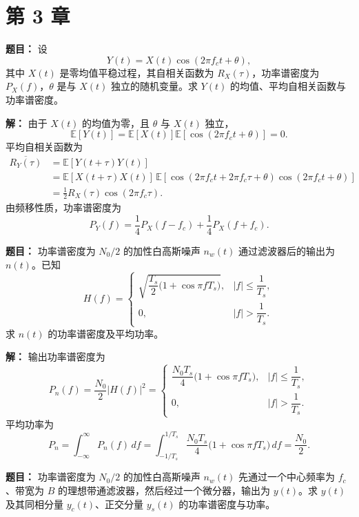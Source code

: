 \section*{第 3 章}

\textbf{题目：}
设
\[
Y(t)=X(t)\cos(2\pi f_c t+\theta),
\]
其中 $X(t)$ 是零均值平稳过程，其自相关函数为 $R_X(\tau)$，功率谱密度为 $P_X(f)$，$\theta$ 是与 $X(t)$ 独立的随机变量。求 $Y(t)$ 的均值、平均自相关函数与功率谱密度。

\par\textbf{解：}
由于 $X(t)$ 的均值为零，且 $\theta$ 与 $X(t)$ 独立，
\[
\mathbb{E}[Y(t)]=\mathbb{E}[X(t)]\mathbb{E}[\cos(2\pi f_c t+\theta)]=0.
\]
平均自相关函数为
\begin{align*}
\overline{R_Y(\tau)}
&=\mathbb{E}[Y(t+\tau)Y(t)] \\
&=\mathbb{E}[X(t+\tau)X(t)]\,
\mathbb{E}\!\left[\cos(2\pi f_c t+2\pi f_c\tau+\theta)\cos(2\pi f_c t+\theta)\right] \\
&=\frac12 R_X(\tau)\cos(2\pi f_c\tau).
\end{align*}
由频移性质，功率谱密度为
\[
P_Y(f)=\frac14 P_X(f-f_c)+\frac14 P_X(f+f_c).
\]

\medskip
{}
\textbf{题目：}
功率谱密度为 $N_0/2$ 的加性白高斯噪声 $n_w(t)$ 通过滤波器后的输出为 $n(t)$。已知
\[
H(f)=
\begin{cases}
\sqrt{\dfrac{T_s}{2}\bigl(1+\cos\pi fT_s\bigr)},& |f|\le \dfrac{1}{T_s},\\[6pt]
0,& |f|>\dfrac{1}{T_s}.
\end{cases}
\]
求 $n(t)$ 的功率谱密度及平均功率。

\par\textbf{解：}
输出功率谱密度为
\[
P_n(f)=\frac{N_0}{2}|H(f)|^2=
\begin{cases}
\dfrac{N_0T_s}{4}\bigl(1+\cos\pi fT_s\bigr),& |f|\le \dfrac{1}{T_s},\\[6pt]
0,& |f|>\dfrac{1}{T_s}.
\end{cases}
\]
平均功率为
\[
P_n=\int_{-\infty}^{\infty}P_n(f)\,df
=\int_{-1/T_s}^{1/T_s}\frac{N_0T_s}{4}\bigl(1+\cos\pi fT_s\bigr)\,df
=\frac{N_0}{2}.
\]

\medskip
{}
\textbf{题目：}
功率谱密度为 $N_0/2$ 的加性白高斯噪声 $n_w(t)$ 先通过一个中心频率为 $f_c$、带宽为 $B$ 的理想带通滤波器，然后经过一个微分器，输出为 $y(t)$。求 $y(t)$ 及其同相分量 $y_c(t)$、正交分量 $y_s(t)$ 的功率谱密度与功率。

